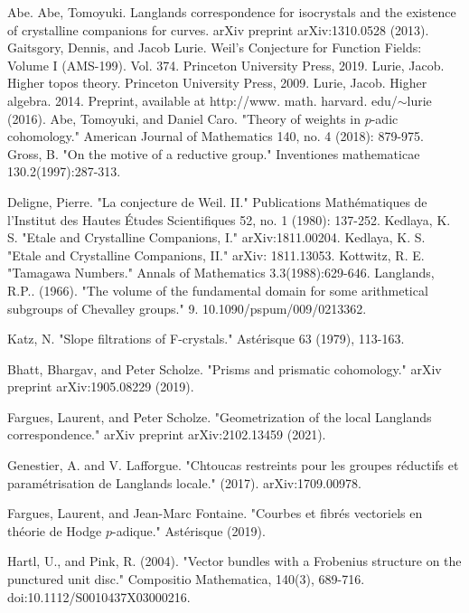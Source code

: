 \documentclass[11pt]{book}
\theoremstyle{definition}
\numberwithin{equation}{section}
\begin{document}
\begin{thebibliography}{10}
 Abe. Abe, Tomoyuki. Langlands correspondence for isocrystals and the existence of crystalline companions for curves. arXiv preprint arXiv:1310.0528 (2013).
 Gaitsgory, Dennis, and Jacob Lurie. Weil's Conjecture for Function Fields: Volume I (AMS-199). Vol. 374. Princeton University Press, 2019.
 Lurie, Jacob. Higher topos theory. Princeton University Press, 2009.
 Lurie, Jacob. Higher algebra. 2014. Preprint, available at http://www. math. harvard. edu/$\sim$lurie (2016).
 Abe, Tomoyuki, and Daniel Caro. "Theory of weights in $p$-adic cohomology." American Journal of Mathematics 140, no. 4 (2018): 879-975.
 Gross, B. "On the motive of a reductive group." Inventiones mathematicae 130.2(1997):287-313.

 Deligne, Pierre. "La conjecture de Weil. II." Publications Math\'ematiques de l'Institut des Hautes \'Etudes Scientifiques 52, no. 1 (1980): 137-252.
 Kedlaya, K. S. "Etale and Crystalline Companions, I." arXiv:1811.00204. 
 Kedlaya, K. S. "Etale and Crystalline Companions, II." arXiv: 1811.13053. 
 Kottwitz, R. E. "Tamagawa Numbers." Annals of Mathematics 3.3(1988):629-646.
 Langlands, R.P.. (1966). "The volume of the fundamental domain for some arithmetical subgroups of Chevalley groups." 9. 10.1090/pspum/009/0213362.

 Katz, N. "Slope filtrations of F-crystals." Ast\'erisque 63 (1979), 113-163.

 Bhatt, Bhargav, and Peter Scholze. "Prisms and prismatic cohomology." arXiv preprint arXiv:1905.08229 (2019).

 Fargues, Laurent, and Peter Scholze. "Geometrization of the local Langlands correspondence." arXiv preprint arXiv:2102.13459 (2021).

 Genestier, A. and  V. Lafforgue. "Chtoucas restreints pour les groupes r\'eductifs et param\'etrisation de Langlands locale." (2017). arXiv:1709.00978.

 Fargues, Laurent, and Jean-Marc Fontaine. "Courbes et fibr\'es vectoriels en th\'eorie de Hodge $p$-adique." Ast\'erisque (2019).

 Hartl, U., and Pink, R. (2004). "Vector bundles with a Frobenius structure on the punctured unit disc." Compositio Mathematica, 140(3), 689-716. doi:10.1112/S0010437X03000216.
 
 
\end{thebibliography}
\end{document}
